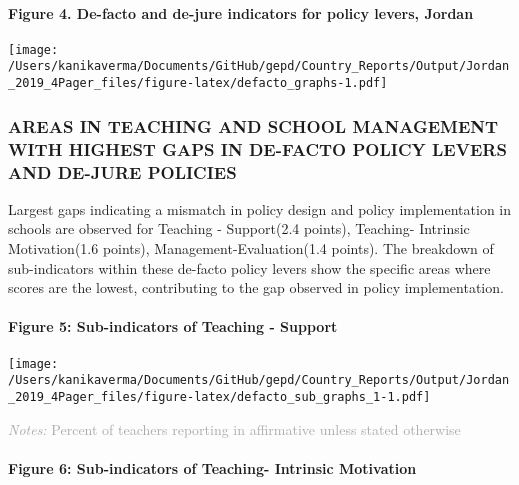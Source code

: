 \documentclass[
  twocolumn]{article}
\begin{document}
\hypertarget{figure-4.-de-facto-and-de-jure-indicators-for-policy-levers-jordan}{%
\paragraph{Figure 4. De-facto and de-jure indicators for policy levers,
Jordan}\label{figure-4.-de-facto-and-de-jure-indicators-for-policy-levers-jordan}}

\texttt{[image: /Users/kanikaverma/Documents/GitHub/gepd/Country\_Reports/Output/Jordan\_2019\_4Pager\_files/figure-latex/defacto\_graphs-1.pdf]}

\hypertarget{areas-in-teaching-and-school-management-with-highest-gaps-in-de-facto-policy-levers-and-de-jure-policies}{%
\subsubsection{\texorpdfstring{\textbf{AREAS IN TEACHING AND SCHOOL
MANAGEMENT WITH HIGHEST GAPS IN DE-FACTO POLICY LEVERS AND DE-JURE
POLICIES}}{AREAS IN TEACHING AND SCHOOL MANAGEMENT WITH HIGHEST GAPS IN DE-FACTO POLICY LEVERS AND DE-JURE POLICIES}}\label{areas-in-teaching-and-school-management-with-highest-gaps-in-de-facto-policy-levers-and-de-jure-policies}}

Largest gaps indicating a mismatch in policy design and policy
implementation in schools are observed for Teaching - Support(2.4
points), Teaching- Intrinsic Motivation(1.6 points),
Management-Evaluation(1.4 points). The breakdown of sub-indicators
within these de-facto policy levers show the specific areas where scores
are the lowest, contributing to the gap observed in policy
implementation. \vfill\null

\hypertarget{figure-5-sub-indicators-of-teaching---support}{%
\paragraph{Figure 5: Sub-indicators of Teaching -
Support}\label{figure-5-sub-indicators-of-teaching---support}}

\texttt{[image: /Users/kanikaverma/Documents/GitHub/gepd/Country\_Reports/Output/Jordan\_2019\_4Pager\_files/figure-latex/defacto\_sub\_graphs\_1-1.pdf]}

{\scriptsize
    \textcolor{darkgray}{\textit{Notes:} Percent of teachers reporting in affirmative unless stated otherwise}
  }

\hypertarget{figure-6-sub-indicators-of-teaching--intrinsic-motivation}{%
\paragraph{Figure 6: Sub-indicators of Teaching- Intrinsic
Motivation}\label{figure-6-sub-indicators-of-teaching--intrinsic-motivation}}
\end{document}
